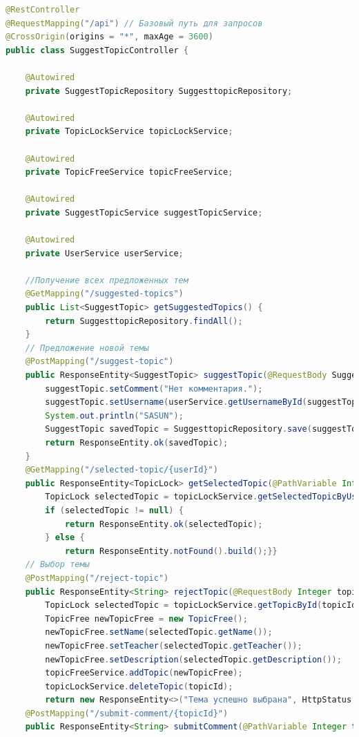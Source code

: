 \documentclass[14pt]{extarticle} %
\begin{document}
\begin{lstlisting}[language=Java, caption={Контроллер предложенных тем}]
@RestController
@RequestMapping("/api") // Базовый путь для запросов
@CrossOrigin(origins = "*", maxAge = 3600)
public class SuggestTopicController {

    @Autowired
    private SuggestTopicRepository SuggesttopicRepository;

    @Autowired
    private TopicLockService topicLockService;

    @Autowired
    private TopicFreeService topicFreeService;

    @Autowired
    private SuggestTopicService suggestTopicService;

    @Autowired
    private UserService userService;

    //Получение всех предложенных тем
    @GetMapping("/suggested-topics")
    public List<SuggestTopic> getSuggestedTopics() {
        return SuggesttopicRepository.findAll();
    }
    // Предложение новой темы
    @PostMapping("/suggest-topic")
    public ResponseEntity<SuggestTopic> suggestTopic(@RequestBody SuggestTopic suggestTopic) {
        suggestTopic.setComment("Нет комментария.");
        suggestTopic.setUsername(userService.getUsernameById(suggestTopic.getUserId()));
        System.out.println("SASUN");
        SuggestTopic savedTopic = SuggesttopicRepository.save(suggestTopic);
        return ResponseEntity.ok(savedTopic);
    }
    @GetMapping("/selected-topic/{userId}")
    public ResponseEntity<TopicLock> getSelectedTopic(@PathVariable Integer userId) {
        TopicLock selectedTopic = topicLockService.getSelectedTopicByUserId(userId);
        if (selectedTopic != null) {
            return ResponseEntity.ok(selectedTopic);
        } else {
            return ResponseEntity.notFound().build();}}
    // Выбор темы
    @PostMapping("/reject-topic")
    public ResponseEntity<String> rejectTopic(@RequestBody Integer topicId) {
        TopicLock selectedTopic = topicLockService.getTopicById(topicId);
        TopicFree newTopicFree = new TopicFree();
        newTopicFree.setName(selectedTopic.getName());
        newTopicFree.setTeacher(selectedTopic.getTeacher());
        newTopicFree.setDescription(selectedTopic.getDescription());
        topicFreeService.addTopic(newTopicFree);
        topicLockService.deleteTopic(topicId);
        return new ResponseEntity<>("Тема успешно выбрана", HttpStatus.OK);}
    @PostMapping("/submit-comment/{topicId}")
    public ResponseEntity<String> submitComment(@PathVariable Integer topicId, @RequestBody String comment) {

\end{lstlisting}
\end{document}
